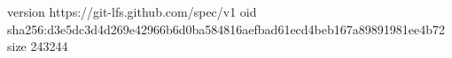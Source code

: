 version https://git-lfs.github.com/spec/v1
oid sha256:d3e5dc3d4d269e42966b6d0ba584816aefbad61ecd4beb167a89891981ee4b72
size 243244
